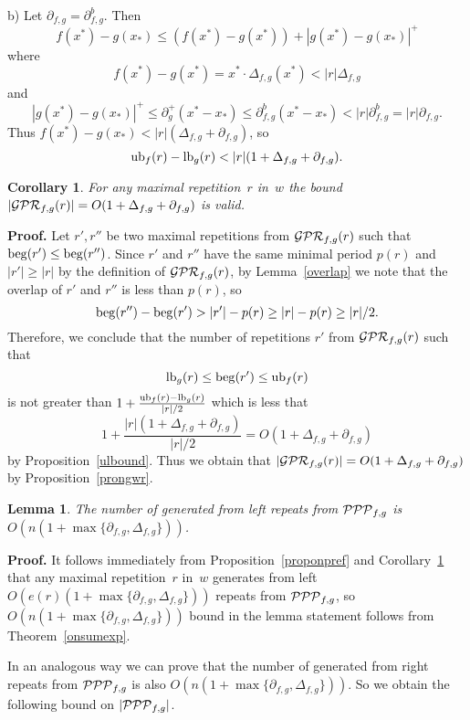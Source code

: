 \documentclass{article}
\newtheorem{corollary}{Corollary}
\newtheorem{lemma}{Lemma}
\begin{document}
b) Let $\partial_{f, g}=\partial^b_{f, g}$. Then
$$
f(x^*)-g(x_*)\le (f(x^*)-g(x^*))+|g(x^*)-g(x_*)|^+
$$
where
$$
f(x^*)-g(x^*)=x^*\cdot\Delta_{f, g}(x^*)<|r|\Delta_{f, g}
$$
and
$$
|g(x^*)-g(x_*)|^+\le \partial^+_g(x^*-x_*)\le \partial^b_{f, g}(x^*-x_*)
<|r|\partial^b_{f, g}=|r|\partial_{f, g}.
$$
Thus $f(x^*)-g(x_*)<|r|(\Delta_{f, g}+\partial_{f, g})$, so
$$
{\rm ub}_f (r)-{\rm lb}_g (r)<|r|(1+\Delta_{f, g}+\partial_{f, g}).
$$

\begin{corollary}
For any maximal repetition~$r$ in~$w$ the bound 
$|{\cal GPR}_{f,g} (r)|=O(1+\Delta_{f, g}+\partial_{f, g})$ is valid.
\label{gwrbound}
\end{corollary}

{\bf Proof.} Let $r', r''$ be two maximal repetitions from ${\cal GPR}_{f,g} (r)$
such that ${\rm beg} (r')\le {\rm beg} (r'')$. Since $r'$ and $r''$ have the
same minimal period $p(r)$ and $|r'|\ge |r|$ by the definition of ${\cal GPR}_{f,g} (r)$,
by Lemma~\ref{overlap} we note that the overlap of $r'$ and $r''$ is less than $p(r)$, so
$$
{\rm beg} (r'')-{\rm beg} (r')>|r'|-p(r)\ge |r|-p(r)\ge |r|/2.
$$
Therefore, we conclude that the number of repetitions $r'$ from ${\cal GPR}_{f,g} (r)$
such that 
$$
{\rm lb}_g (r)\le {\rm beg} (r')\le {\rm ub}_f (r)
$$
is not greater than $1+\frac{{\rm ub}_f (r)-{\rm lb}_g (r)}{|r|/2}$ which is
less that 
$$
1+\frac{|r|(1+\Delta_{f, g}+\partial_{f, g})}{|r|/2}=O(1+\Delta_{f, g}+\partial_{f, g})
$$
by Proposition~\ref{ulbound}. Thus we obtain that $|{\cal GPR}_{f,g} (r)|=O(1+\Delta_{f, g}+\partial_{f, g})$
by Proposition~\ref{prongwr}.

\begin{lemma}
The number of generated from left repeats from ${\cal PPP}_{f,g}$ is
$O(n(1+\max\{\partial_{f, g}, \Delta_{f, g}\}))$. 
\label{onleftPPP}
\end{lemma}

{\bf Proof.} It follows immediately from Proposition~\ref{proponpref}
and Corollary~\ref{gwrbound} that any maximal repetition~$r$ in~$w$
generates from left $O(e(r)(1+\max\{\partial_{f, g}, \Delta_{f, g}\}))$
repeats from ${\cal PPP}_{f,g}$, so $O(n(1+\max\{\partial_{f, g}, \Delta_{f, g}\}))$
bound in the lemma statement follows from Theorem~\ref{onsumexp}.

In an analogous way we can prove that the number of generated from right 
repeats from ${\cal PPP}_{f,g}$ is also $O(n(1+\max\{\partial_{f, g}, \Delta_{f, g}\}))$. 
So we obtain the following bound on $|{\cal PPP}_{f,g}|$.
\end{document}
